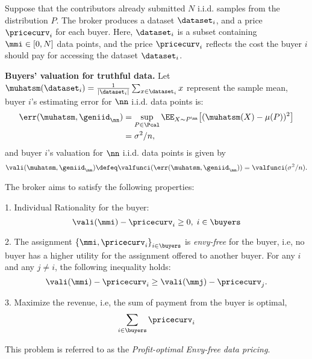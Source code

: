 Suppose that the contributors already submitted $N$ i.i.d. samples from the distribution $P$. The broker produces a dataset $\dataset_i$, and a price $\pricecurv_i$ for each buyer. Here, $\dataset_i$ is a subset  containing $\mmi \in [0,N]$ data points, and the price $\pricecurv_i$ reflects the cost the buyer $i$ should pay for accessing the dataset $\dataset_i$.      



\textbf{Buyers' valuation for truthful data.} Let $\muhatsm(\dataset_i)=\frac{1}{|\dataset_i|}\sum_{x \in  \dataset_i} x$ represent the sample mean, buyer $i$'s estimating error for $\nn$ i.i.d. data points is:
\begin{align*}
    \err(\muhatsm, \geniid_{\nn}) & = \sup_{P \in \Pcal} \EE_{X \sim P^{\nn}} \big[(\muhatsm(X) - \mu(P))^2\big] \\ & = \sigma^2/n,
\end{align*}
and buyer $i$'s valuation for $\nn$ i.i.d. data points is given by
\begin{align*}
    \vali(\muhatsm, \geniid_{\nn}) \defeq \valfunci(\err(\muhatsm, \geniid_{\nn})) = \valfunci(\sigma^2/n).
    \label{eqn:buyerval}
\end{align*} 

The broker aims to satisfy the following properties:

1. Individual Rationality for the buyer: \[\vali( \mmi )- \pricecurv_i \geq 0 , \; i \in \buyers  \]

2. The assignment $\left\{ \mmi, \pricecurv_i \right\}_{i \in \buyers }$ is \emph{envy-free} for the buyer, i.e, no buyer has a higher utility for the assignment offered to another buyer. For any $i$ and any $j \neq i$, the following inequality holds: 
    \[ \vali(\mmi) - \pricecurv_i  \geq   \vali(\mmj) - \pricecurv_j. \]

3. Maximize the revenue, i.e, the sum of payment from the buyer is optimal, \[ \sum_{i \in \buyers} \pricecurv_i \]



This problem is referred to as the \emph{Profit-optimal Envy-free data pricing}.



